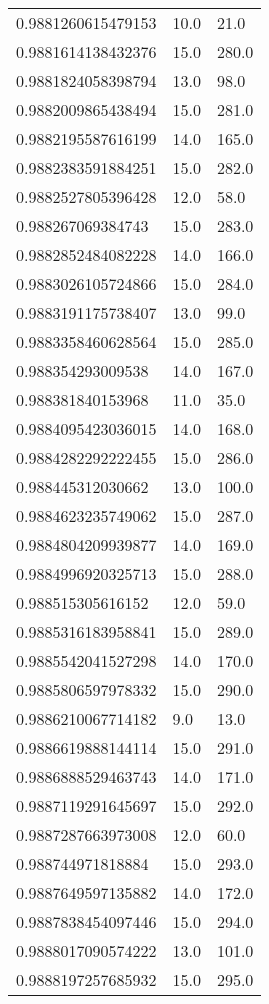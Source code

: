 \begin{center}
\begin{supertabular}[H]{p{0.30\textwidth}p{0.05\textwidth}p{0.05\textwidth}}
0.9881260615479153 & 10.0 & 21.0 \\ 
0.9881614138432376 & 15.0 & 280.0 \\ 
0.9881824058398794 & 13.0 & 98.0 \\ 
0.9882009865438494 & 15.0 & 281.0 \\ 
0.9882195587616199 & 14.0 & 165.0 \\ 
0.9882383591884251 & 15.0 & 282.0 \\ 
0.9882527805396428 & 12.0 & 58.0 \\ 
0.988267069384743 & 15.0 & 283.0 \\ 
0.9882852484082228 & 14.0 & 166.0 \\ 
0.9883026105724866 & 15.0 & 284.0 \\ 
0.9883191175738407 & 13.0 & 99.0 \\ 
0.9883358460628564 & 15.0 & 285.0 \\ 
0.988354293009538 & 14.0 & 167.0 \\ 
0.988381840153968 & 11.0 & 35.0 \\ 
0.9884095423036015 & 14.0 & 168.0 \\ 
0.9884282292222455 & 15.0 & 286.0 \\ 
0.988445312030662 & 13.0 & 100.0 \\ 
0.9884623235749062 & 15.0 & 287.0 \\ 
0.9884804209939877 & 14.0 & 169.0 \\ 
0.9884996920325713 & 15.0 & 288.0 \\ 
0.988515305616152 & 12.0 & 59.0 \\ 
0.9885316183958841 & 15.0 & 289.0 \\ 
0.9885542041527298 & 14.0 & 170.0 \\ 
0.9885806597978332 & 15.0 & 290.0 \\ 
0.9886210067714182 & 9.0 & 13.0 \\ 
0.9886619888144114 & 15.0 & 291.0 \\ 
0.9886888529463743 & 14.0 & 171.0 \\ 
0.9887119291645697 & 15.0 & 292.0 \\ 
0.9887287663973008 & 12.0 & 60.0 \\ 
0.988744971818884 & 15.0 & 293.0 \\ 
0.9887649597135882 & 14.0 & 172.0 \\ 
0.9887838454097446 & 15.0 & 294.0 \\ 
0.9888017090574222 & 13.0 & 101.0 \\ 
0.9888197257685932 & 15.0 & 295.0 \\ 

\end{supertabular}
\end{center}
